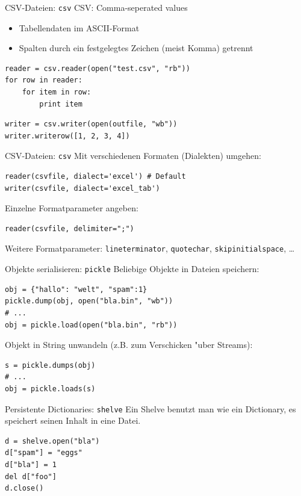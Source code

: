 \begin{frame}[fragile]{CSV-Dateien: \texttt{csv}}
CSV: Comma-seperated values
\begin{itemize}
\item Tabellendaten im ASCII-Format
\item Spalten durch ein festgelegtes Zeichen (meist Komma) getrennt
\end{itemize}
\begin{lstlisting}[style=Python]
reader = csv.reader(open("test.csv", "rb"))
for row in reader:
    for item in row: 
        print item
\end{lstlisting}
\begin{lstlisting}[style=Python]
writer = csv.writer(open(outfile, "wb"))
writer.writerow([1, 2, 3, 4])
\end{lstlisting}
\end{frame}

\begin{frame}[fragile]{CSV-Dateien: \texttt{csv}}
Mit verschiedenen Formaten (Dialekten) umgehen:
\begin{lstlisting}[style=Python]
reader(csvfile, dialect='excel') # Default
writer(csvfile, dialect='excel_tab')
\end{lstlisting}
\vspace*{3mm}
Einzelne Formatparameter angeben:
\begin{lstlisting}[style=Python]
reader(csvfile, delimiter=";")
\end{lstlisting}
Weitere Formatparameter: \texttt{lineterminator}, \texttt{quotechar}, \texttt{skipinitialspace}, \dots
\end{frame}

\begin{frame}[fragile]{Objekte serialisieren: \texttt{pickle}}
Beliebige Objekte in Dateien speichern:
\begin{lstlisting}[style=Python]
obj = {"hallo": "welt", "spam":1}
pickle.dump(obj, open("bla.bin", "wb"))
# ...
obj = pickle.load(open("bla.bin", "rb"))
\end{lstlisting}
Objekt in String unwandeln (z.B. zum Verschicken "uber Streams):
\begin{lstlisting}[style=Python]
s = pickle.dumps(obj)
# ...
obj = pickle.loads(s)
\end{lstlisting}
\end{frame}

\begin{frame}[fragile]{Persistente Dictionaries: \texttt{shelve}}
Ein Shelve benutzt man wie ein Dictionary, es speichert seinen Inhalt in eine Datei.
\begin{lstlisting}[style=Python]
d = shelve.open("bla")
d["spam"] = "eggs"
d["bla"] = 1
del d["foo"]   
d.close()  
\end{lstlisting}
\end{frame}


